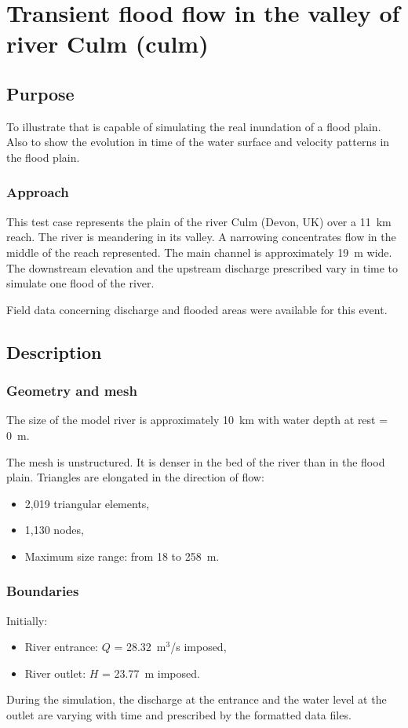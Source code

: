 \chapter{Transient flood flow in the valley of river Culm (culm)}
\section{Purpose}
To illustrate that  is capable of simulating the real
inundation of a flood plain. Also to show the evolution in time of the 
water surface and velocity patterns in the flood plain.

\subsection{Approach}
This test case represents the plain of the river Culm (Devon, UK) over a 11~km
reach. The river is meandering in its valley. A narrowing concentrates
flow in the middle of the reach represented. The main channel is
approximately 19~m wide. The downstream elevation and the upstream discharge
prescribed vary in time to simulate one flood of the river.

Field data concerning discharge and flooded areas were available for this event.

\section{Description}

\subsection{Geometry and mesh}

The size of the model river is approximately 10~km
with water depth at rest = 0~m.

The mesh is unstructured. It is denser in the bed of the river than in the flood plain.
Triangles are elongated in the direction of flow:
\begin{itemize}
\item 2,019 triangular elements,
\item 1,130 nodes,
\item Maximum size range: from 18 to 258~m.
\end{itemize}

\subsection{Boundaries}
Initially:
\begin{itemize}
\item River entrance: $Q$ = 28.32~m$^3$/s imposed,
\item  River outlet: $H$ = 23.77~m imposed.
 \end{itemize}
During the simulation, the discharge at the entrance and the water level at the outlet are
varying with time and prescribed by the formatted data files.

